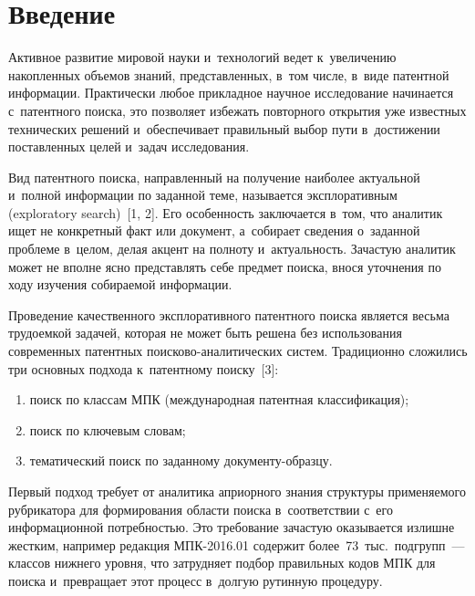   
\vspace*{-6pt}



\thispagestyle{headings}

\begin{multicols}{2}

\label{st\stat}

\section{Введение}

  Активное развитие мировой науки и~технологий ведет к~увеличению 
накопленных объемов знаний, представленных, в~том числе, в~виде патентной 
информации. Практически любое прикладное научное исследование 
начинается с~патентного поиска, это позволяет избежать повторного открытия 
уже известных технических решений и~обеспечивает правильный выбор пути 
в~достижении по\-став\-лен\-ных целей и~задач исследования.
  
  Вид патентного поиска, направленный на получение наиболее актуальной 
  и~полной информации по заданной теме, называется эксплоративным (exploratory 
search)~[1, 2]. Его особенность заключается в~том, что аналитик ищет не 
конкретный факт или документ, а~собирает сведения о~заданной проб\-ле\-ме 
в~целом, делая акцент на полноту и~актуальность. Зачастую аналитик может не 
вполне ясно пред\-став\-лять себе предмет поиска, внося уточнения по ходу 
изучения собираемой информации. 
  
  Проведение качественного эксплоративного патентного поиска является 
весьма трудоемкой зада\-чей, которая не может быть решена без использования 
современных патентных поисково-ана\-ли\-ти\-че\-ских сис\-тем. Традиционно 
сложились три основных подхода к~патентному поиску~[3]:
  \begin{enumerate}[(1)]
\item   поиск по классам МПК (международная патентная классификация);
\item   поиск по ключевым словам;
\item   тематический поиск по заданному до\-ку\-мен\-ту-об\-разцу.
\end{enumerate}

  Первый подход требует от аналитика априорного знания структуры 
применяемого рубрикатора для формирования области поиска в~соответствии 
с~его информационной потребностью. Это требование зачастую оказывается 
излишне жестким, например редакция МПК-2016.01 содержит более~73~тыс.\ 
подгрупп~--- классов нижнего уровня, что затрудняет подбор правильных 
кодов МПК для поиска и~превращает этот процесс в~долгую рутинную 
процедуру.
  

\end{multicols}
